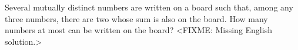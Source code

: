 \problem{}
Several mutually distinct numbers are written on a board such that, among any three
numbers, there are two whose sum is also on the board.
How many numbers at most can be written on the board?
\solution
<FIXME: Missing English solution.>
\endproblem
